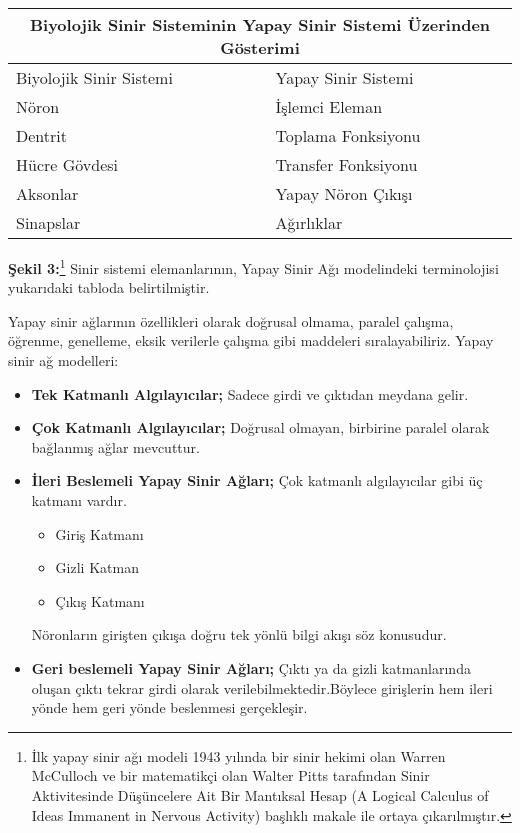 \documentclass{IEEEtran}
\begin{document}
            \hspace{-10pt}
            \begin{tabular}{|p{4cm}|p{4cm}|}\hline
                
                \multicolumn{2}{|c|}{{\tiny Biyolojik Sinir Sisteminin Yapay Sinir Sistemi Üzerinden Gösterimi}} \\
                \hline
                Biyolojik Sinir Sistemi   & Yapay Sinir Sistemi \\ \hline
                Nöron & İşlemci Eleman \\ \hline
                Dentrit & Toplama Fonksiyonu \\ \hline
                Hücre Gövdesi & Transfer Fonksiyonu \\ \hline
                Aksonlar & Yapay Nöron Çıkışı \\ \hline
                Sinapslar & Ağırlıklar \\ \hline
                \end{tabular}
            \newline    
            \textbf{Şekil 3:}\footnote{İlk yapay sinir ağı modeli 1943 yılında bir sinir hekimi olan Warren McCulloch ve bir matematikçi olan Walter Pitts tarafından Sinir Aktivitesinde Düşüncelere Ait Bir Mantıksal Hesap (A Logical Calculus of Ideas Immanent in Nervous Activity)  başlıklı makale ile ortaya çıkarılmıştır.} Sinir sistemi elemanlarının, Yapay Sinir Ağı modelindeki terminolojisi yukarıdaki tabloda belirtilmiştir.\cite{NetworkModel}
              
            
            \vspace{15pt}    
            Yapay sinir ağlarının özellikleri olarak doğrusal olmama, paralel çalışma, öğrenme, genelleme, eksik verilerle çalışma gibi maddeleri sıralayabiliriz.
            Yapay sinir ağ modelleri:
            \begin{itemize}
                \item \textbf{Tek Katmanlı Algılayıcılar;} Sadece girdi ve çıktıdan meydana gelir.
                \item \textbf{Çok Katmanlı Algılayıcılar;} Doğrusal olmayan, birbirine paralel olarak bağlanmış ağlar mevcuttur.
                \item \textbf{İleri Beslemeli Yapay Sinir Ağları;} Çok katmanlı algılayıcılar gibi üç katmanı vardır.
                \begin{itemize}
                    \item Giriş Katmanı
                    \item Gizli Katman
                    \item Çıkış Katmanı
                \end{itemize}
        
            Nöronların girişten çıkışa doğru tek yönlü bilgi akışı söz konusudur. 
            \item \textbf{Geri beslemeli Yapay Sinir Ağları;} Çıktı ya da gizli katmanlarında oluşan çıktı tekrar girdi olarak verilebilmektedir.Böylece girişlerin hem ileri yönde hem geri yönde beslenmesi gerçekleşir.
        \end{itemize}
        
\end{document}

